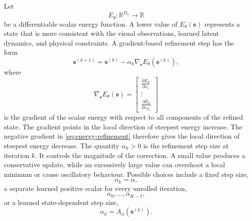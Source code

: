 \documentclass[11pt,a4paper]{article}
\begin{document}
Let 
\begin{equation} 
	E_\theta: \mathbb{R}^{D_s} \longrightarrow \mathbb{R} 
\end{equation} 
be a differentiable scalar energy function. A lower value of $E_\theta(\mathbf s)$ represents a state that is more consistent with the visual observations, learned latent dynamics, and physical constraints. A gradient-based refinement step has the form 
\begin{equation} 
	\mathbf s^{(k+1)} = \mathbf s^{(k)} - \alpha_k \nabla_{\mathbf s} E_\theta \left( \mathbf s^{(k)} \right), \label{eq:energy-refinement} 
\end{equation} 
where 
\begin{equation} 
	\nabla_{\mathbf s} E_\theta(\mathbf s) = \begin{bmatrix} \displaystyle\frac{\partial E_\theta}{\partial s_1} \\ \vdots \\ \displaystyle\frac{\partial E_\theta}{\partial s_{D_s}} \end{bmatrix} 
\end{equation} 
is the gradient of the scalar energy with respect to all components of the refined state. The gradient points in the local direction of steepest energy increase. The negative gradient in \eqref{eq:energy-refinement} therefore gives the local direction of steepest energy decrease. The quantity $\alpha_k>0$ is the refinement step size at iteration $k$. It controls the magnitude of the correction. A small value produces a conservative update, while an excessively large value can overshoot a local minimum or cause oscillatory behaviour. Possible choices include a fixed step size, 
\begin{equation} 
	\alpha_k=\alpha, 
\end{equation} 
a separate learned positive scalar for every unrolled iteration, 
\begin{equation} 
	\alpha_0,\ldots,\alpha_{K-1}, 
\end{equation} 
or a learned state-dependent step size, 
\begin{equation} 
	\alpha_k=A_\phi(\mathbf s^{(k)}). 
\end{equation} 
\end{document}

